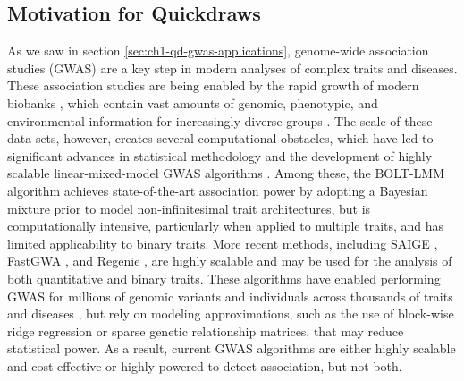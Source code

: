 \subsection{Motivation for Quickdraws}
As we saw in section \ref{sec:ch1-qd-gwas-applications}, genome-wide association studies (GWAS) are a key step in modern analyses of complex traits and diseases.
%
These association studies are being enabled by the rapid growth of modern biobanks \cite{bycroft2018uk,nagai2017overview,ramirez2022all,wojcik2019genetic,chen2011china,kurki2023finngen}, which contain vast amounts of genomic, phenotypic, and environmental information for increasingly diverse groups \cite{zhou2022global}.
%
The scale of these data sets, however, creates several computational obstacles, which have led to significant advances in statistical methodology and the development of highly scalable linear-mixed-model GWAS algorithms \cite{yu2006unified,kang2008efficient,kang2010variance,zhang2010mixed,zhou2012genome,lippert2011fast,segura2012efficient,listgarten2012improved,listgarten2013fast,loh2015efficient,loh2018mixed,jiang2019resource}.
%
Among these, the BOLT-LMM algorithm \cite{loh2015efficient,loh2018mixed} achieves state-of-the-art association power by adopting a Bayesian mixture prior to model non-infinitesimal trait architectures, but is computationally intensive, particularly when applied to multiple traits, and has limited applicability to binary traits.
%
More recent methods, including SAIGE \cite{zhou2018efficiently}, FastGWA \cite{jiang2019resource,jiang2021generalized}, and Regenie \cite{mbatchou2021computationally}, are highly scalable and may be used for the analysis of both quantitative and binary traits.
%
These algorithms have enabled performing GWAS for millions of genomic variants and individuals \cite{yengo2022saturated} across thousands of traits and diseases \cite{wang2021rare}, but rely on modeling approximations, such as the use of block-wise ridge regression
 or sparse genetic relationship matrices, that may reduce statistical power.
%
As a result, current GWAS algorithms are either highly scalable and cost effective or highly powered to detect association, but not both.

